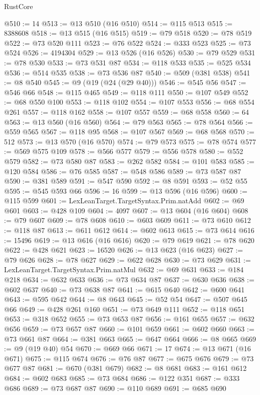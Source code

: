 \begin{lexlean}{RustCore}
\begin{coremodule}
@510 := 14
@513 := @13 @510 (@16 @510)
@514 := @115 @513
@515 := 8388608
@518 := @13 @515 (@16 @515)
@519 := @79 @518
@520 := @78 @519
@522 := @73 @520 @111
@523 := @76 @522
@524 := @333 @523
@525 := @73 @524
@526 := 4194304
@529 := @13 @526 (@16 @526)
@530 := @79 @529
@531 := @78 @530
@533 := @73 @531 @87
@534 := @118 @533
@535 := @525 @534
@536 := @514 @535
@538 := @73 @536 @87
@540 := @509 (@381 @538)
@541 := @8 @540
@545 := @9 (@19 (@24 (@29 @40)))
@546 := @545 @56
@547 := @546 @66
@548 := @115 @465
@549 := @118 @111
@550 := @107 @549
@552 := @68 @550 @100
@553 := @118 @102
@554 := @107 @553
@556 := @68 @554 @261
@557 := @118 @162
@558 := @107 @557
@559 := @68 @558
@560 := 64
@563 := @13 @560 (@16 @560)
@564 := @79 @563
@565 := @78 @564
@566 := @559 @565
@567 := @118 @95
@568 := @107 @567
@569 := @68 @568
@570 := 512
@573 := @13 @570 (@16 @570)
@574 := @79 @573
@575 := @78 @574
@577 := @569 @575 @109
@578 := @566 @577
@579 := @556 @578
@580 := @552 @579
@582 := @73 @580 @87
@583 := @262 @582
@584 := @101 @583
@585 := @120 @584
@586 := @76 @585
@587 := @548 @586
@589 := @73 @587 @87
@590 := @381 @589
@591 := @547 @590
@592 := @8 @591
@593 := @52 @55
@595 := @545 @593 @66
@596 := 16
@599 := @13 @596 (@16 @596)
@600 := @115 @599
@601 := LexLeanTarget.TargetSyntax.Prim.natAdd
@602 := @69 @601
@603 := @428 @109
@604 := 4097
@607 := @13 @604 (@16 @604)
@608 := @79 @607
@609 := @78 @608
@610 := @603 @609
@611 := @73 @610
@612 := @118 @87
@613 := @611 @612
@614 := @602 @613
@615 := @73 @614
@616 := 15496
@619 := @13 @616 (@16 @616)
@620 := @79 @619
@621 := @78 @620
@622 := @428 @621
@623 := 16520
@626 := @13 @623 (@16 @623)
@627 := @79 @626
@628 := @78 @627
@629 := @622 @628
@630 := @73 @629
@631 := LexLeanTarget.TargetSyntax.Prim.natMul
@632 := @69 @631
@633 := @184 @218
@634 := @632 @633
@636 := @73 @634 @87
@637 := @630 @636
@638 := @602 @637
@640 := @73 @638 @87
@641 := @615 @640
@642 := @600 @641
@643 := @595 @642
@644 := @8 @643
@645 := @52 @54
@647 := @507 @645 @66
@649 := @428 @261 @160
@651 := @73 @649 @111
@652 := @118 @651
@653 := @318 @652
@655 := @73 @653 @87
@656 := @161 @655
@657 := @632 @656
@659 := @73 @657 @87
@660 := @101 @659
@661 := @602 @660
@663 := @73 @661 @87
@664 := @381 @663
@665 := @647 @664
@666 := @8 @665
@669 := @9 (@19 @40) @54
@670 := @669 @66
@671 := 17
@674 := @13 @671 (@16 @671)
@675 := @115 @674
@676 := @76 @87
@677 := @675 @676
@679 := @73 @677 @87
@681 := @670 (@381 @679)
@682 := @8 @681
@683 := @161 @612
@684 := @602 @683
@685 := @73 @684
@686 := @122 @351
@687 := @333 @686
@689 := @73 @687 @87
@690 := @110 @689
@691 := @685 @690

\end{coremodule}
\end{lexlean}
